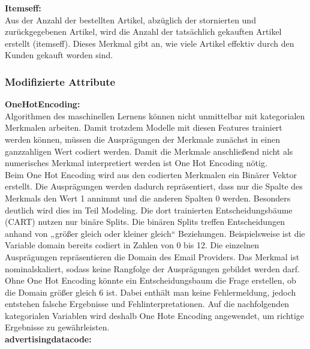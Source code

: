 \textbf{Itemseff:}\\

Aus der Anzahl der bestellten Artikel, abzüglich der stornierten und zurückgegebenen Artikel, wird die Anzahl der tatsächlich gekauften Artikel erstellt (itemseff). Dieses Merkmal gibt an, wie viele Artikel effektiv durch den Kunden gekauft worden sind.

\subsubsection{Modifizierte Attribute}

\textbf{OneHotEncoding:}\\

Algorithmen des maschinellen Lernens können nicht unmittelbar mit kategorialen Merkmalen arbeiten. Damit trotzdem Modelle mit diesen Features trainiert werden können, müssen die Ausprägungen der Merkmale zunächst in einen ganzzahligen Wert codiert werden. Damit die Merkmale anschließend nicht als numerisches Merkmal interpretiert werden ist One Hot Encoding nötig.\\

Beim One Hot Encoding wird aus den codierten Merkmalen ein Binärer Vektor erstellt. Die Ausprägungen werden dadurch repräsentiert, dass nur die Spalte des Merkmals den Wert 1 annimmt und die anderen Spalten 0 werden. Besonders deutlich wird dies im Teil Modeling. Die dort trainierten Entscheidungsbäume (CART) nutzen nur binäre Splits. Die binären Splits treffen Entscheidungen anhand von „größer gleich oder kleiner gleich“ Beziehungen. Beispielsweise ist die Variable domain bereits codiert in Zahlen von 0 bis 12. Die einzelnen Ausprägungen repräsentieren die Domain des Email Providers. Das Merkmal ist nominalskaliert, sodass keine Rangfolge der Ausprägungen gebildet werden darf. Ohne One Hot Encoding könnte ein Entscheidungsbaum die Frage erstellen, ob die Domain größer gleich 6 ist. Dabei enthält man keine Fehlermeldung, jedoch entstehen falsche Ergebnisse und Fehlinterpretationen. Auf die nachfolgenden kategorialen Variablen wird deshalb One Hote Encoding angewendet, um richtige Ergebnisse zu gewährleisten.\\

\textbf{advertisingdatacode:}\\

